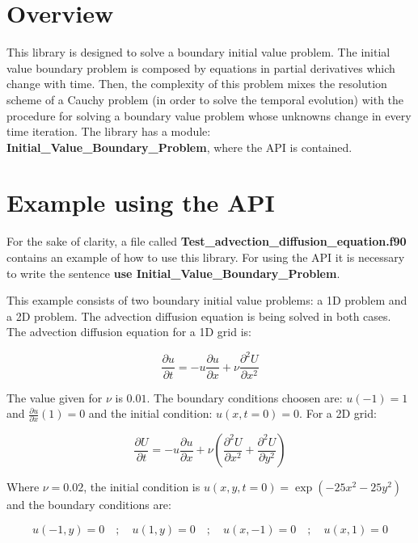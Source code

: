 \section{Overview}

This library is designed to solve a boundary initial value problem. 
The initial value boundary problem is composed by equations in partial derivatives which change with time. 
Then, the complexity of this problem mixes the resolution scheme of a Cauchy problem (in order to solve the temporal evolution) with the procedure for solving a boundary value problem whose unknowns
change in every time iteration.
The library has a module:  \textbf{Initial\_Value\_Boundary\_Problem}, where the API is contained. 

\section{Example using the API}

For the sake of clarity, a file called \textbf{Test\_advection\_diffusion\_equation.f90} contains an example of how to use this library. For using the API it is necessary to write the sentence \textbf{use Initial\_Value\_Boundary\_Problem}. 

This example consists of two boundary initial value problems: a 1D problem and a 2D problem. The advection diffusion equation is being solved in both cases. The advection diffusion equation for a 1D grid is:

\begin{equation*}      	
\frac{\partial u}{\partial t} = - u \frac{\partial u}{\partial x} + \nu \frac{\partial^2 U}{\partial x^2}
\end{equation*}

The value given for $\nu$ is $0.01$. The boundary conditions choosen are: $u(-1)=1$ and $\frac{\partial u}{\partial x}(1)=0$ and the initial condition: $u(x,t=0)=0$. For a 2D grid:


\begin{equation*}
\frac{\partial U}{\partial t} =  - u \frac{\partial u}{\partial x} + \nu \left( \frac{\partial^2 U}{\partial x^2} + \frac{\partial^2 U}{\partial y^2} \right)
\end{equation*}

Where $\nu=0.02$, the initial condition is $u(x,y,t=0)=\exp(-25x^2-25y^2)$ and the boundary conditions are:

\begin{equation*}      	
u(-1,y) = 0 \quad ; \quad 
u(1,y) = 0  \quad ; \quad 
u(x,-1) = 0 \quad ; \quad 
u(x,1) = 0  
\end{equation*}


